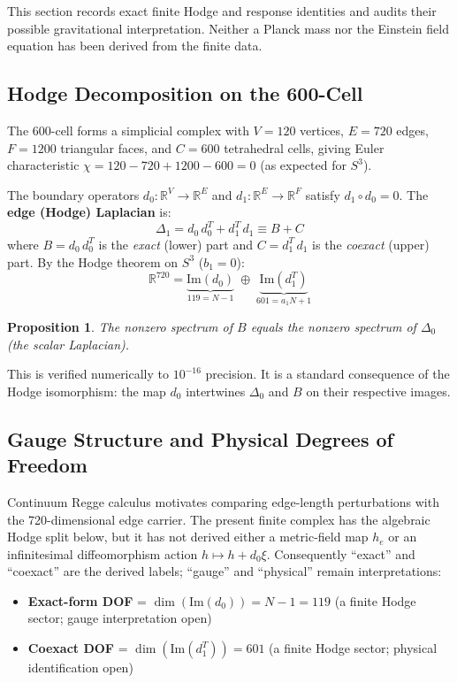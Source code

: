 \documentclass[12pt,a4paper]{article}
\newtheorem{proposition}{Proposition}
\theoremstyle{definition}
\begin{document}
This section records exact finite Hodge and response identities and audits their possible gravitational interpretation.  Neither a Planck mass nor the Einstein field equation has been derived from the finite data.

\subsection{Hodge Decomposition on the 600-Cell}

The 600-cell forms a simplicial complex with $V = 120$ vertices, $E = 720$ edges, $F = 1200$ triangular faces, and $C = 600$ tetrahedral cells, giving Euler characteristic $\chi = 120 - 720 + 1200 - 600 = 0$ (as expected for $S^3$).

The boundary operators $d_0: \mathbb{R}^V \to \mathbb{R}^E$ and $d_1: \mathbb{R}^E \to \mathbb{R}^F$ satisfy $d_1 \circ d_0 = 0$. The \textbf{edge (Hodge) Laplacian} is:
\begin{equation}
\Delta_1 = d_0\,d_0^T + d_1^T\,d_1 \equiv B + C
\end{equation}
where $B = d_0\,d_0^T$ is the \emph{exact} (lower) part and $C = d_1^T\,d_1$ is the \emph{coexact} (upper) part. By the Hodge theorem on $S^3$ ($b_1 = 0$):
\begin{equation}
\mathbb{R}^{720} = \underbrace{\mathrm{Im}(d_0)}_{119 = N-1} \;\oplus\; \underbrace{\mathrm{Im}(d_1^T)}_{601 = a_1 N + 1}
\end{equation}

\begin{proposition}
The nonzero spectrum of $B$ equals the nonzero spectrum of $\Delta_0$ (the scalar Laplacian).
\end{proposition}

This is verified numerically to $10^{-16}$ precision. It is a standard consequence of the Hodge isomorphism: the map $d_0$ intertwines $\Delta_0$ and $B$ on their respective images.

\subsection{Gauge Structure and Physical Degrees of Freedom}

Continuum Regge calculus motivates comparing edge-length perturbations with the 720-dimensional edge carrier.  The present finite complex has the algebraic Hodge split below, but it has not derived either a metric-field map $h_e$ or an infinitesimal diffeomorphism action $h\mapsto h+d_0\xi$.  Consequently ``exact'' and ``coexact'' are the derived labels; ``gauge'' and ``physical'' remain interpretations:
\begin{itemize}
\item \textbf{Exact-form DOF} = $\dim(\mathrm{Im}(d_0)) = N - 1 = 119$ (a finite Hodge sector; gauge interpretation open)
\item \textbf{Coexact DOF} = $\dim(\mathrm{Im}(d_1^T)) = 601$ (a finite Hodge sector; physical identification open)
\end{itemize}
\end{document}

